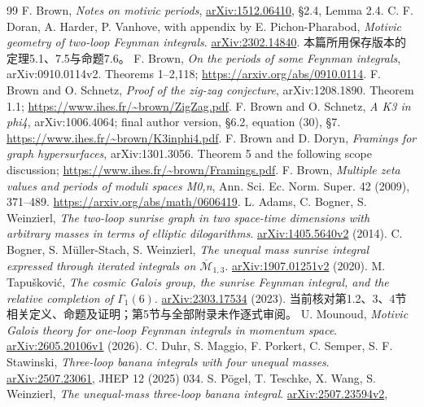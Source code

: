 \documentclass[11pt,a4paper]{ctexart}
\theoremstyle{cnplain}\newtheorem{theorem}{定理}[section]
\theoremstyle{definition}\newtheorem{definition}[theorem]{定义}
\theoremstyle{remark}\newtheorem{remark}[theorem]{注}
\begin{document}
\begin{thebibliography}{99}
F. Brown, \emph{Notes on motivic periods},
\href{https://arxiv.org/abs/1512.06410}{arXiv:1512.06410},
\S2.4, Lemma 2.4.
C. F. Doran, A. Harder, P. Vanhove, with appendix by E. Pichon-Pharabod,
\emph{Motivic geometry of two-loop Feynman integrals}.
\href{https://arxiv.org/abs/2302.14840}{arXiv:2302.14840}.
本篇所用保存版本的定理5.1、7.5与命题7.6。
F. Brown, \emph{On the periods of some Feynman integrals}, arXiv:0910.0114v2. Theorems 1--2,118; \url{https://arxiv.org/abs/0910.0114}.
F. Brown and O. Schnetz, \emph{Proof of the zig-zag conjecture}, arXiv:1208.1890. Theorem 1.1; \url{https://www.ihes.fr/~brown/ZigZag.pdf}.
F. Brown and O. Schnetz, \emph{A K3 in phi4}, arXiv:1006.4064; final author version, \S6.2, equation (30), \S7. \url{https://www.ihes.fr/~brown/K3inphi4.pdf}.
F. Brown and D. Doryn, \emph{Framings for graph hypersurfaces}, arXiv:1301.3056. Theorem 5 and the following scope discussion; \url{https://www.ihes.fr/~brown/Framings.pdf}.
F. Brown, \emph{Multiple zeta values and periods of moduli spaces M0,n}, Ann. Sci. Ec. Norm. Super. 42 (2009), 371--489. \url{https://arxiv.org/abs/math/0606419}.
L. Adams, C. Bogner, S. Weinzierl,
\emph{The two-loop sunrise graph in two space-time dimensions with arbitrary masses in terms of elliptic dilogarithms}.
\href{https://arxiv.org/abs/1405.5640v2}{arXiv:1405.5640v2} (2014).
C. Bogner, S. Müller-Stach, S. Weinzierl,
\emph{The unequal mass sunrise integral expressed through iterated integrals on
$\overline{\mathcal M}_{1,3}$}.
\href{https://arxiv.org/abs/1907.01251v2}{arXiv:1907.01251v2} (2020).
M. Tapušković,
\emph{The cosmic Galois group, the sunrise Feynman integral, and the relative completion of $\Gamma_1(6)$}.
\href{https://arxiv.org/abs/2303.17534}{arXiv:2303.17534} (2023).
当前核对第1.2、3、4节相关定义、命题及证明；第5节与全部附录未作逐式审阅。
U. Mounoud,
\emph{Motivic Galois theory for one-loop Feynman integrals in momentum space}.
\href{https://arxiv.org/abs/2605.20106v1}{arXiv:2605.20106v1} (2026).
C. Duhr, S. Maggio, F. Porkert, C. Semper, S. F. Stawinski,
\emph{Three-loop banana integrals with four unequal masses}.
\href{https://arxiv.org/abs/2507.23061}{arXiv:2507.23061}, JHEP 12 (2025) 034.
S. Pögel, T. Teschke, X. Wang, S. Weinzierl,
\emph{The unequal-mass three-loop banana integral}.
\href{https://arxiv.org/abs/2507.23594v2}{arXiv:2507.23594v2},

\end{thebibliography}
\end{document}
